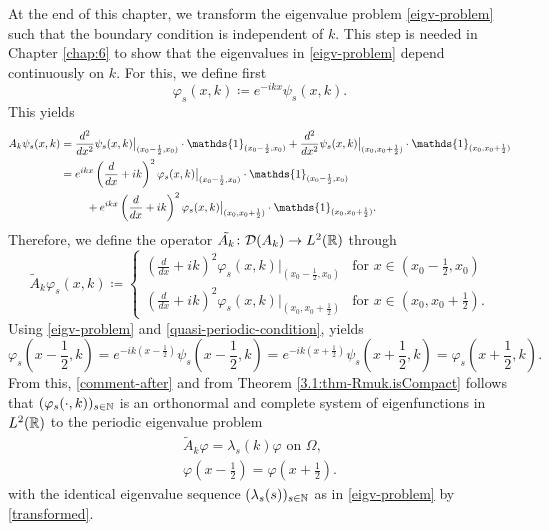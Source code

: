 At the end of this chapter, we transform the eigenvalue problem \eqref{eigv-problem} such that the boundary condition is independent of $k$. This step is needed in Chapter \ref{chap:6} to show that the eigenvalues in \ref{eigv-problem} depend continuously on $k$. For this, we define first
	\[ \varphi_{s}(x, k) \coloneqq e^{-ikx} \psi_{s}(x, k). \]
This yields
	\begin{align}
		A_{k} \psi_{s}(x, k) & = \frac{d^{2}}{dx^{2}} \psi_{s}(x, k)\big|_{(x_{0} - \frac{1}{2}, x_{0})} \cdot \mathds{1}_{(x_{0} - \frac{1}{2}, x_{0})} + \frac{d^{2}}{dx^{2}} \psi_{s}(x, k)\big|_{(x_{0}, x_{0}  + \frac{1}{2})} \cdot \mathds{1}_{(x_{0}, x_{0} + \frac{1}{2})} \notag \\
			& = e^{ikx} \left( \frac{d}{dx} + ik \right)^{2} \varphi_{s}(x, k)\big|_{(x_{0} - \frac{1}{2}, x_{0})} \cdot \mathds{1}_{(x_{0} - \frac{1}{2}, x_{0})} \notag \\
			& ~\qquad + e^{ikx} \left( \frac{d}{dx} + ik \right)^{2} \varphi_{s}(x, k)\big|_{(x_{0}, x_{0}  + \frac{1}{2})} \cdot \mathds{1}_{(x_{0}, x_{0} + \frac{1}{2})}. \label{transformed}
	\end{align}
Therefore, we define the operator $\tilde{A_{k}} \colon \mathcal{D}(A_{k}) \rightarrow L^{2}(\mathbb{R})$ through  %
	\[ \tilde{A}_{k} \varphi_{s}(x, k) \coloneqq \begin{cases}
		\left( \frac{d}{dx} + ik \right)^{2} \varphi_{s}(x, k)|_{(x_{0} - \frac{1}{2}, x_{0})} & \text{for } x \in (x_{0} - \frac{1}{2}, x_{0}) \\ \left( \frac{d}{dx} + ik \right)^{2} \varphi_{s}(x, k)|_{(x_{0}, x_{0}  + \frac{1}{2})} & \text{for } x \in (x_{0}, x_{0} + \frac{1}{2}).
	\end{cases} \] 
Using \eqref{eigv-problem} and \eqref{quasi-periodic-condition}, yields
	\[ \varphi_{s}\left(x - \frac{1}{2}, k\right) = e^{-ik(x - \frac{1}{2})} \psi_{s}\left(x - \frac{1}{2}, k\right) = e^{-ik(x + \frac{1}{2})} \psi_{s}\left(x + \frac{1}{2}, k\right) = \varphi_{s}\left(x + \frac{1}{2}, k\right). \]
From this, \eqref{comment-after} and from Theorem \ref{3.1:thm-Rmuk.isCompact} follows that $(\varphi_{s}(\cdot, k))_{s \in \mathbb{N}}$ is an orthonormal and complete system of eigenfunctions in $L^{2}(\mathbb{R})$ to the periodic eigenvalue problem
	\begin{align}
		\tilde{A}_{k} \varphi = \lambda_{s}(k) \varphi \text{ on } \Omega, \label{mod-eigv-problem} \\
		\varphi\left(x - \frac{1}{2}\right) = \varphi\left(x + \frac{1}{2}\right). \label{periodic-condition}
	\end{align}
with the identical eigenvalue sequence $(\lambda_{s}(s))_{s \in \mathbb{N}}$ as in \eqref{eigv-problem} by \eqref{transformed}.
